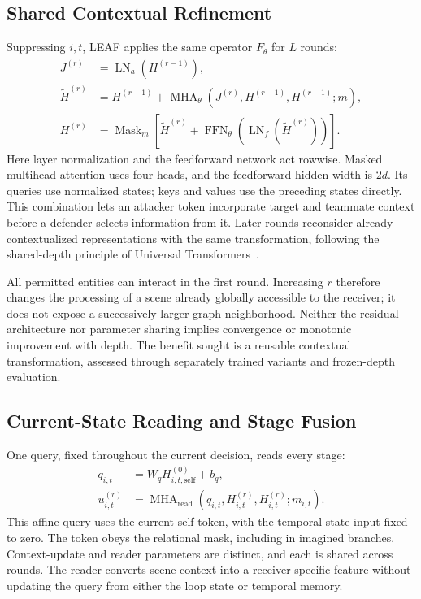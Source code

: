 \subsection{Shared Contextual Refinement}
Suppressing $i,t$, LEAF applies the same operator $F_\theta$ for $L$ rounds:
\begin{align}
 J^{(r)}&=\operatorname{LN}_a(H^{(r-1)}),\nonumber\\
 \widetilde H^{(r)}&=H^{(r-1)}+
       \operatorname{MHA}_{\theta}(J^{(r)},H^{(r-1)},H^{(r-1)};m),\nonumber\\
 H^{(r)}&=\operatorname{Mask}_{m}\!\left[\widetilde H^{(r)}+
       \operatorname{FFN}_{\theta}(\operatorname{LN}_f(\widetilde H^{(r)}))\right].
 \label{eq:loop}
\end{align}
Here layer normalization and the feedforward network act rowwise. Masked multihead attention uses four heads, and the feedforward hidden width is $2d$. Its queries use normalized states; keys and values use the preceding states directly. This combination lets an attacker token incorporate target and teammate context before a defender selects information from it. Later rounds reconsider already contextualized representations with the same transformation, following the shared-depth principle of Universal Transformers~\cite{dehghani2019universal}.

All permitted entities can interact in the first round. Increasing $r$ therefore changes the processing of a scene already globally accessible to the receiver; it does not expose a successively larger graph neighborhood. Neither the residual architecture nor parameter sharing implies convergence or monotonic improvement with depth. The benefit sought is a reusable contextual transformation, assessed through separately trained variants and frozen-depth evaluation.

\subsection{Current-State Reading and Stage Fusion}
One query, fixed throughout the current decision, reads every stage:
\begin{align}
 q_{i,t}&=W_q H^{(0)}_{i,t,\mathrm{self}}+b_q,\nonumber\\
 u_{i,t}^{(r)}&=\operatorname{MHA}_{\mathrm{read}}
          (q_{i,t},H_{i,t}^{(r)},H_{i,t}^{(r)};m_{i,t}).
 \label{eq:read}
\end{align}
This affine query uses the current self token, with the temporal-state input fixed to zero. The token obeys the relational mask, including in imagined branches. Context-update and reader parameters are distinct, and each is shared across rounds. The reader converts scene context into a receiver-specific feature without updating the query from either the loop state or temporal memory.

